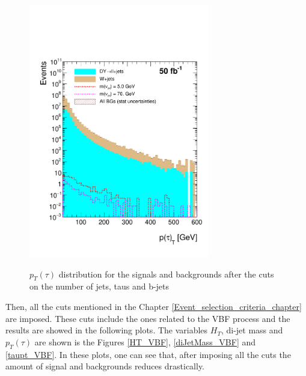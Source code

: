   \begin{figure}[h] 
 \centering
 \caption{$p_T(\tau)$ distribution for the signals and backgrounds after the cuts on the number of jets, taus and b-jets}
 \includegraphics[width=0.7\textwidth]{./Capitulos/Analysis/AfterBJets/TauPt_MET_20} 
 \label{taupt_bjets}
 \end{figure} 
 
 Then, all the cuts mentioned in the Chapter \ref{Event_selection_criteria_chapter} are imposed. These cuts include the ones related to the VBF process and the results are showed in the following 
 plots. The variables $H_T$, di-jet mass and $p_T(\tau)$ are shown is the Figures \ref{HT_VBF}, \ref{diJetMass_VBF} and \ref{taupt_VBF}. In these plots, one can see that, after imposing all the 
 cuts the amount of signal and backgrounds reduces drastically. 
 
